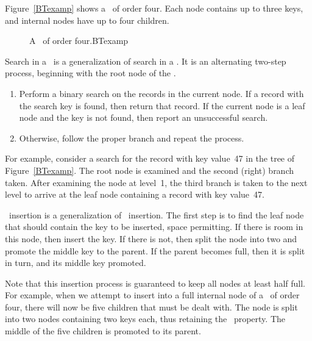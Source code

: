 Figure~\ref{BTexamp} shows a \Btree\ of order four.
Each node contains up to three keys, and
internal nodes have up to four children.

\begin{figure}
\vspace{-\bigskipamount}\vspace{-\bigskipamount}

{A \Btree\ of order four.}{BTexamp}
\end{figure}

Search in a \Btree\ is a generalization of search in a \TTtree.
It is an alternating two-step process, beginning with the root node of
the \Btree.

\begin{enumerate}

\item
Perform a binary search on the records in the
current node.
If a record with the search key is found, then return that record.
If the current node is a leaf node and the key is not found,
then report an unsuccessful search.

\item
Otherwise, follow the proper branch and repeat the process.

\end{enumerate}

For example, consider a search for the record with key value~47 in the
tree of Figure~\ref{BTexamp}.
The root node is examined and the second (right) branch taken.
After examining the node at level~1, the third branch is taken to the
next level to arrive at the leaf node containing a record with key
value~47.

\Btree\ insertion is a generalization of \TTtree\ insertion.
The first step is to find the leaf node that should contain the
key to be inserted, space permitting.
If there is room in this node, then insert the key.
If there is not, then split the node into two and promote the middle
key to the parent.
If the parent becomes full, then it is split in turn, and its middle
key promoted.

Note that this insertion process is guaranteed to keep all nodes at
least half full.
For example, when we attempt to insert into a full internal node of a
\Btree\ of order four, there will now be five children that must be
dealt with.
The node is split into two nodes containing two keys each, thus
retaining the \Btree\ property.
The middle of the five children is promoted to its parent.

